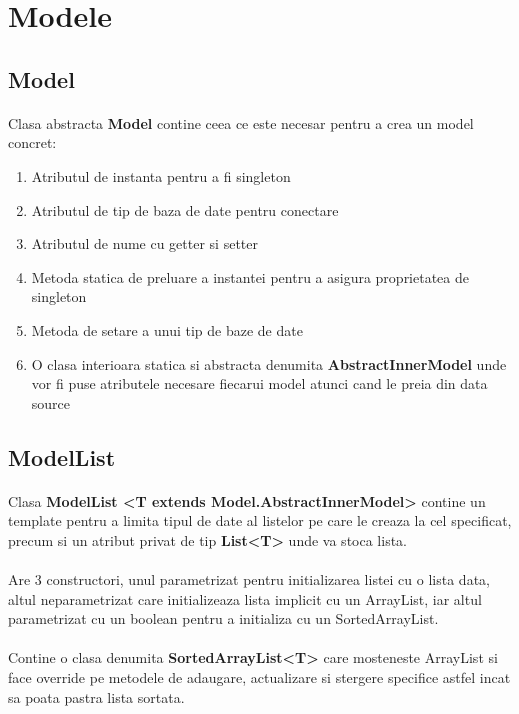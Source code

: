 \documentclass[oneside]{article}
\begin{document}
\section[Modele]{Modele}
\subsection[Model]{Model}
\paragraph{}Clasa abstracta \textbf{Model} contine ceea ce este necesar pentru a crea un model concret:
\begin{enumerate}
    \item Atributul de instanta pentru a fi singleton
    \item Atributul de tip de baza de date pentru conectare
    \item Atributul de nume cu getter si setter
    \item Metoda statica de preluare a instantei pentru a asigura proprietatea de singleton
    \item Metoda de setare a unui tip de baze de date
    \item O clasa interioara statica si abstracta denumita \textbf{AbstractInnerModel} unde vor fi puse atributele necesare fiecarui model atunci cand le preia din data source
\end{enumerate}

\subsection[ModelList]{ModelList}
\paragraph{} Clasa \textbf{ModelList <T extends Model.AbstractInnerModel>} contine un template pentru a limita tipul de date al listelor pe care le creaza la cel specificat, precum si un atribut privat de tip \textbf{List<T>} unde va stoca lista.
\paragraph{} Are 3 constructori, unul parametrizat pentru initializarea listei cu o lista data, altul neparametrizat care initializeaza lista implicit cu un ArrayList, iar altul parametrizat cu un boolean pentru a initializa cu un SortedArrayList.
\paragraph{} Contine o clasa denumita \textbf{SortedArrayList<T>} care mosteneste ArrayList si face override pe metodele de adaugare, actualizare si stergere specifice astfel incat sa poata pastra lista sortata.
\end{document}
